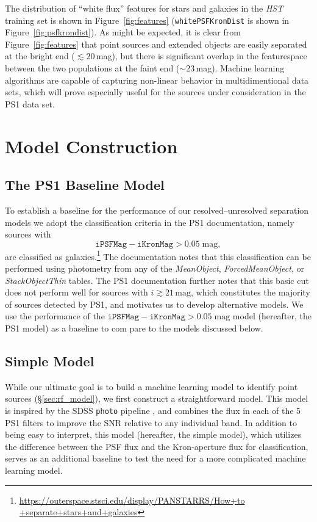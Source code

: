 \documentclass[twocolumn]{aastex62}
\begin{document}
\begin{CJK*}{UTF8}{gbsn}
The distribution of ``white flux'' features for stars and galaxies in the
\textit{HST} training set is shown in Figure~\ref{fig:features}
(\texttt{whitePSFKronDist} is shown in Figure~\ref{fig:psfkrondist}). As
might be expected, it is clear from Figure~\ref{fig:features} that point
sources and extended objects are easily separated at the bright end
($\lesssim 20$\,mag), but there is significant overlap in the featurespace
between the two populations at the faint end ($\sim$23\,mag). Machine
learning algorithms are capable of capturing non-linear behavior in
multidimentional data sets, which will prove especially useful for the
sources under consideration in the PS1 data set.

\section{Model Construction}
\subsection{The PS1 Baseline Model}\label{sec:ps1_model}

To establish a baseline for the performance of our resolved--unresolved
separation models we adopt the classification criteria in the PS1
documentation, namely sources with 
% 
$$ \mathtt{iPSFMag} - \mathtt{iKronMag}
> 0.05\;\mathrm{mag},$$ 
% 
are classified as
galaxies.\footnote{\url{https://outerspace.stsci.edu/display/PANSTARRS/How+to
 +separate+stars+and+galaxies}} The documentation notes that this
classification can be performed using photometry from any of the
\textit{MeanObject}, \textit{ForcedMeanObject}, or \textit{StackObjectThin}
tables. The PS1 documentation further notes that this basic cut does not
perform well for sources with $i \gtrsim 21\,\mathrm{mag}$, which
constitutes the majority of sources detected by PS1, and motivates us to
develop alternative models. We use the performance of the $\mathtt{iPSFMag}
- \mathtt{iKronMag} > 0.05\;\mathrm{mag}$ model (hereafter, the PS1 model)
as a baseline to com pare to the models discussed below.

\subsection{Simple Model}\label{sec:simple_model}

While our ultimate goal is to build a machine learning model to identify
point sources (\S\ref{sec:rf_model}), we first construct a straightforward
model. This model is inspired by the SDSS \texttt{photo} pipeline
\citep{Lupton01}, and combines the flux in each of the 5 PS1 filters to
improve the SNR relative to any individual band. In addition to being easy
to interpret, this model (hereafter, the simple model), which utilizes the
difference between the PSF flux and the Kron-aperture flux for
classification, serves as an additional baseline to test the need for a more
complicated machine learning model.


\end{CJK*}
\end{document}
